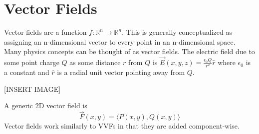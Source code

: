 \section{Vector Fields}
\noindent
Vector fields are a function $f : \mathbb{R}^n \to \mathbb{R}^n$. This is generally conceptualized as assigning an n-dimensional vector to every point in an n-dimensional space.\\
Many physics concepts can be thought of as vector fields. The electric field due to some point charge $Q$ as some distance $r$ from $Q$ is $\vec{E}(x,y,z) = \frac{\epsilon_{0}Q}{r^2}\hat{r}$ where $\epsilon_{0}$ is a constant and $\hat{r}$ is a radial unit vector pointing away from $Q$.

[INSERT IMAGE]

\noindent
A generic 2D vector field is 
\begin{equation*}
	\vec{F}(x,y) = \langle P(x,y), Q(x,y) \rangle	
\end{equation*}
Vector fields work similarly to VVFs in that they are added component-wise.